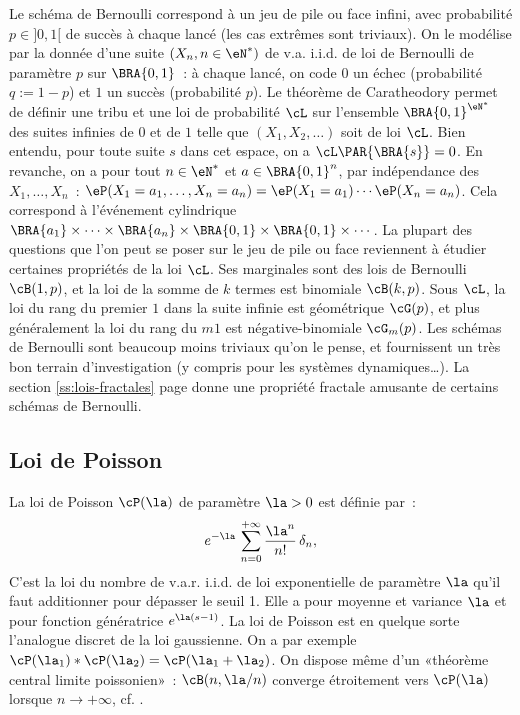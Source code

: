 %
\begin{rem}\label{ss:loi:schema-bernoulli}
  Le schéma de Bernoulli correspond à un jeu de pile ou face infini, avec
  probabilité $p\in]0,1[$ de succès à chaque lancé (les cas extrêmes sont
  triviaux). On le modélise par la donnée d'une suite $(X_n,n\in\eN^*)$ de v.a.
  i.i.d. de loi de Bernoulli de paramètre $p$ sur $\BRA{0,1}$~: à chaque
  lancé, on code $0$ un échec (probabilité $q:=1-p$) et $1$ un succès
  (probabilité $p$).  Le théorème de Caratheodory permet de définir une tribu
  et une loi de probabilité $\cL$ sur l'ensemble $\BRA{0,1}^{\eN^*}$ des
  suites infinies de $0$ et de $1$ telle que $(X_1,X_2,\ldots)$ soit de loi 
  $\cL$.
  Bien entendu, pour toute suite $s$ dans cet espace, on a
  $\cL\PAR{\BRA{s}}=0$. En revanche, on a pour tout $n\in\eN^*$ et
  $a\in\BRA{0,1}^n$, par indépendance des $X_1,\ldots,X_n$~:
  $\eP(X_1=a_1,\ldots,X_n=a_n)=\eP(X_1=a_1)\cdots\eP(X_n=a_n)$. 
  Cela correspond à l'événement cylindrique 
  $\BRA{a_1}\times\cdots\times\BRA{a_n}\times\BRA{0,1}\times\BRA{0,1}\times\cdots$. La plupart des questions
  que l'on peut se poser sur le jeu de pile ou face reviennent à étudier
  certaines propriétés de la loi $\cL$. Ses marginales sont des lois de 
  Bernoulli $\cB(1,p)$, et la loi de la somme de $k$ termes est binomiale
  $\cB(k,p)$. Sous $\cL$, la loi du rang du premier $1$ dans la
  suite infinie est géométrique $\cG(p)$, et plus généralement la loi du rang
  du $m$\Ieme $1$ est négative-binomiale $\cG_m(p)$.
  Les schémas de Bernoulli sont beaucoup moins triviaux qu'on le pense, et
  fournissent un très bon terrain d'investigation (y compris pour les
  systèmes dynamiques\ldots). La section \ref{ss:lois-fractales} page
  \pageref{ss:lois-fractales} donne une propriété fractale amusante de
  certains schémas de Bernoulli.
\end{rem}

%
\subsection{Loi de Poisson}\label{ss:loi:poisson}
%

La loi de Poisson $\cP(\la)$ de paramètre $\la>0$ est définie par~:
$$
e^{-\la}\,\sum_{n=0}^{+\infty}\frac{\la^n}{n!}\,\delta_n,
$$
C'est la loi du nombre de v.a.r. i.i.d. de loi exponentielle de paramètre
$\la$ qu'il faut additionner pour dépasser le seuil 1. Elle a pour moyenne et
variance $\la$ et pour fonction génératrice $e^{\la(s-1)}$.
La loi de Poisson est en quelque sorte l'analogue discret de la loi gaussienne.
On a par exemple $\cP(\la_1)*\cP(\la_2)=\cP(\la_1+\la_2)$. On dispose même
d'un «théorème central limite poissonien»~: 
$\cB(n,\la/n)$ converge étroitement vers $\cP(\la)$ lorsque $n\to+\infty$,
cf. \cite[th. V.5.6 p. 148]{barbe-ledoux}.

